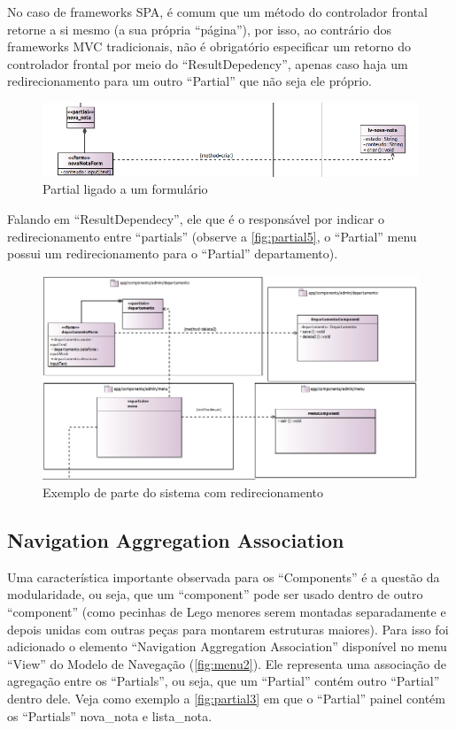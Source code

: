 \documentclass[
article,			%
11pt,				%
oneside,			%
a4paper,			%
english,			%
brazil,				%
sumario=tradicional
]{abntex2}
\begin{document}
No caso de frameworks SPA, é comum que um método do controlador frontal retorne a si mesmo (a sua própria ``página''), por isso, ao contrário dos frameworks MVC tradicionais, não é obrigatório especificar um retorno do controlador frontal por meio do ``ResultDepedency'', apenas caso haja um redirecionamento para um outro ``Partial'' que não seja ele próprio.

\begin{figure}
	\centering
	\includegraphics[width=0.7\linewidth]{figuras/Partial2}
	\caption{Partial ligado a um formulário}
	\label{fig:partial2}
\end{figure}

Falando em ``ResultDependecy'', ele que é o responsável por indicar o redirecionamento entre ``partials'' (observe a \autoref{fig:partial5}, o ``Partial'' menu possui um redirecionamento para o ``Partial'' departamento).

\begin{figure}
	\centering
	\includegraphics[width=0.7\linewidth]{figuras/Partial5}
	\caption{Exemplo de parte do sistema com redirecionamento}
	\label{fig:partial5}
\end{figure}


\subsection{Navigation Aggregation Association}

Uma característica importante observada para os ``Components'' é a questão da modularidade, ou seja, que um ``component'' pode ser usado dentro de outro ``component'' (como pecinhas de Lego menores serem montadas separadamente e depois unidas com outras peças para montarem estruturas maiores). Para isso foi adicionado o elemento ``Navigation Aggregation Association'' disponível no menu ``View'' do Modelo de Navegação (\autoref{fig:menu2}). Ele representa uma associação de agregação entre os ``Partials'', ou seja, que um ``Partial'' contém outro ``Partial'' dentro dele. Veja como exemplo a \autoref{fig:partial3} em que o ``Partial'' painel contém os ``Partials'' nova\_nota e lista\_nota.
\end{document}
